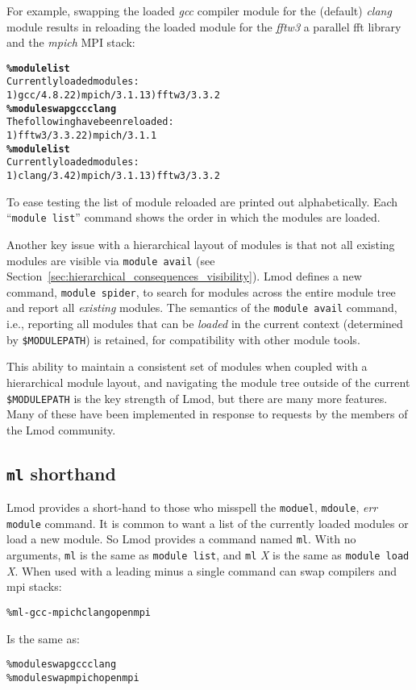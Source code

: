 For example, swapping the loaded \emph{gcc} compiler module for the (default)
\emph{clang} module results in reloading the loaded module for the
\emph{fftw3} a parallel fft library and the \emph{mpich} MPI stack:
{\small
  \begin{alltt}
    \textbf{\% module list}
    Currently loaded modules:
    1) gcc/4.8.2  2) mpich/3.1.1  3) fftw3/3.3.2
    \textbf{\% module swap gcc clang}
    The following have been reloaded:
    1) fftw3/3.3.2  2) mpich/3.1.1
    \textbf{\% module list}
    Currently loaded modules:
    1) clang/3.4  2) mpich/3.1.1  3) fftw3/3.3.2
\end{alltt}
}
\noindent
To ease testing the list of module reloaded are printed out
alphabetically. Each ``\texttt{module list}'' command shows the
order in which the modules are loaded.


Another key issue with a hierarchical layout of modules is that not all
existing modules are visible via \texttt{module avail} (see
Section~\ref{sec:hierarchical_consequences_visibility}). Lmod defines a
new command, \texttt{module spider}, to search for modules across the
entire module tree and report all \emph{existing} modules. The semantics of
the \texttt{module avail} command, i.e., reporting all modules that can
be \emph{loaded} in the current context (determined by
\texttt{\$MODULEPATH}) is retained, for compatibility with other module
tools.

This ability to maintain a consistent set of modules when coupled with a
hierarchical module layout, and navigating the module tree outside of the
current \texttt{\$MODULEPATH} is the key strength of Lmod, but there are
many more features.  Many of these have been implemented in response to
requests by the members of the Lmod community.

\subsection{\texttt{ml} shorthand}

Lmod provides a short-hand to those who misspell the \texttt{moduel}, \texttt{mdoule}, \emph{err}
\texttt{module} command.  It is common to want a list of the currently loaded
modules or load a new module.  So Lmod provides a command named
\texttt{ml}.  With no arguments, \texttt{ml} is the same as
\texttt{module list}, and \texttt{ml} \emph{X} is the same as \texttt{module
  load} \emph{X}.  When used with a leading minus a single command can
swap compilers and mpi stacks: 
{\small
  \begin{alltt}
      \% ml -gcc -mpich clang openmpi
  \end{alltt}
}  
\noindent
Is the same as:
{\small
  \begin{alltt}
      \% module swap gcc clang
      \% module swap mpich openmpi
  \end{alltt}
}  

